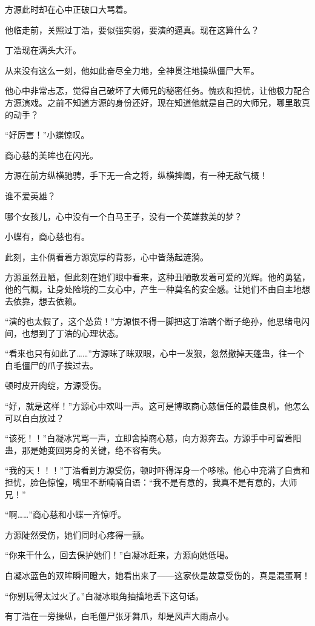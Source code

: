 \begin{this_body}
方源此时却在心中正破口大骂着。

他临走前，关照过丁浩，要似强实弱，要演的逼真。现在这算什么？

丁浩现在满头大汗。

从来没有这么一刻，他如此奋尽全力地，全神贯注地操纵僵尸大军。

他心中非常忐忑，觉得自己破坏了大师兄的秘密任务。愧疚和担忧，让他极力配合方源演戏。之前不知道方源的身份还好，现在知道他就是自己的大师兄，哪里敢真的动手？

“好厉害！”小蝶惊叹。

商心慈的美眸也在闪光。

方源在前方纵横驰骋，手下无一合之将，纵横捭阖，有一种无敌气概！

谁不爱英雄？

哪个女孩儿，心中没有一个白马王子，没有一个英雄救美的梦？

小蝶有，商心慈也有。

此刻，主仆俩看着方源宽厚的背影，心中皆荡起涟漪。

方源虽然丑陋，但此刻在她们眼中看来，这种丑陋散发着可爱的光辉。他的勇猛，他的气概，让身处险境的二女心中，产生一种莫名的安全感。让她们不由自主地想去依靠，想去依赖。

“演的也太假了，这个怂货！”方源恨不得一脚把这丁浩踹个断子绝孙，他思绪电闪间，也想到了丁浩的心理状态。

“看来也只有如此了……”方源眯了眯双眼，心中一发狠，忽然撤掉天蓬蛊，往一个白毛僵尸的爪子挨过去。

顿时皮开肉绽，方源受伤。

“好，就是这样！”方源心中欢叫一声。这可是博取商心慈信任的最佳良机，他怎么可以白白放过？

“该死！！”白凝冰咒骂一声，立即舍掉商心慈，向方源奔去。方源手中可留着阳蛊，那是她变回男身的关键，绝不容有失。

“我的天！！！”丁浩看到方源受伤，顿时吓得浑身一个哆嗦。他心中充满了自责和担忧，脸色惊惶，嘴里不断喃喃自语：“我不是有意的，我真不是有意的，大师兄！”

“啊……”商心慈和小蝶一齐惊呼。

方源陡然受伤，她们同时心疼得一颤。

“你来干什么，回去保护她们！”白凝冰赶来，方源向她低喝。

白凝冰蓝色的双眸瞬间瞪大，她看出来了——这家伙是故意受伤的，真是混蛋啊！

“你别玩得太过火了。”白凝冰眼角抽搐地丢下这句话。

有丁浩在一旁操纵，白毛僵尸张牙舞爪，却是风声大雨点小。


\end{this_body}
